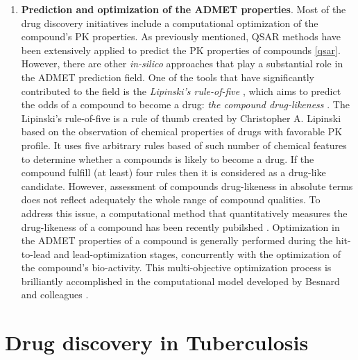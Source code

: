 \documentclass[12pt, a4paper,twoside]{tesi_upf}
\begin{document}
{\begin{enumerate}
\item \textbf{Prediction and optimization of the ADMET properties}. Most of the drug discovery initiatives include a computational optimization of the compound's PK properties. As previously mentioned, QSAR methods have been extensively applied to predict the PK properties of compounds \ref{qsar}. However, there are other \textit{in-silico} approaches that play a substantial role in the ADMET prediction field.   One of the tools that have significantly contributed to the field is the \textit{Lipinski's rule-of-five} , which aims to predict the odds of a compound to become a drug: \textit{the compound drug-likeness} \cite{Lipinski2004}. The Lipinski's rule-of-five is a rule of thumb created by Christopher A. Lipinski based on the observation of chemical properties of drugs with favorable PK profile. It uses five arbitrary rules based of such number of chemical features to determine whether a compounds is likely to become a drug. If the compound fulfill (at least) four rules then it is considered as a drug-like candidate. However, assessment of compounds drug-likeness in absolute terms does not reflect adequately the whole range of compound qualities. To address this issue, a computational method that quantitatively measures the drug-likeness of a compound has been recently pubilshed \cite{Bickerton2012}. Optimization in the ADMET properties of a compound is generally performed during the hit-to-lead and lead-optimization stages, concurrently with the optimization of the compound's bio-activity. This multi-objective optimization process is brilliantly accomplished in the computational model developed by Besnard and colleagues \cite{Besnard2012b}.\end{enumerate}


\section{Drug discovery in Tuberculosis}}
\end{document}
